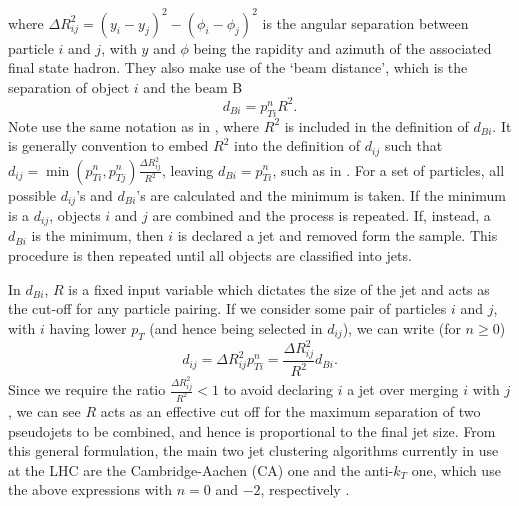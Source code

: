 \documentclass[12pt]{article}
\begin{document}
%
where $\Delta R^2_{ij} =(y_i - y_j)^2 - (\phi_i - \phi_j)^2$ is the angular separation between particle $i$ and $j$, with $y$ and $\phi$ being the rapidity and azimuth of the associated final state hadron. They also make use of the `beam distance', which is the separation of object $i$ and the beam B
%
\begin{equation}
d_{Bi} = p^n_{Ti}R^2.
\end{equation}
%
Note use the same notation as in \cite{Krohn:2009zg}, where $R^2$ is included in the definition of $d_{Bi}$. It is generally convention to embed $R^2$ into the definition of $d_{ij}$ such that $d_{ij} = \min(p_{Ti}^n,p_{Tj}^n)\frac{\Delta R^2_{ij}}{R^2}$, leaving $d_{Bi} = p^n_{Ti}$, such as in \cite{Cacciari:2011ma}. For a set of particles, all possible $d_{ij}$'s and $d_{Bi}$'s are calculated and the minimum is taken. If the minimum is a $d_{ij}$, objects $i$ and $j$ are combined and the process is repeated. If, instead, a $d_{Bi}$ is the minimum, then $i$ is declared a jet and removed form the sample. This procedure is then  repeated until all objects are classified into jets.

In $d_{Bi}$, $R$ is a fixed input variable which dictates the size of the jet and acts as the cut-off for any particle pairing. If we consider some pair of particles $i$ and $j$, with $i$ having lower $p_T$ (and hence being selected in $d_{ij}$), we can write (for $n\ge0$)
%
\begin{equation}
d_{ij} = \Delta R^2_{ij} p^n_{Ti} = \frac{\Delta R^2_{ij}}{R^2} d_{Bi}.
\end{equation}
%
Since we require the ratio $\frac{\Delta R^2_{ij}}{R^2}<1$ to avoid declaring $i$ a jet over merging $i$ with $j$, we can see $R$ acts as an effective cut off for the maximum separation of two pseudojets to be combined, and hence is proportional to the final jet size.
%
From this general formulation, the main two jet clustering algorithms  currently in use at the LHC are the Cambridge-Aachen (CA) \cite{Wobisch:1998wt,Dokshitzer:1997in} one and the anti-$k_T$\cite{Cacciari:2008gp} one, which use the above expressions with $n=0$ and $-2$, respectively \cite{Salam:2009jx}.
\end{document}

